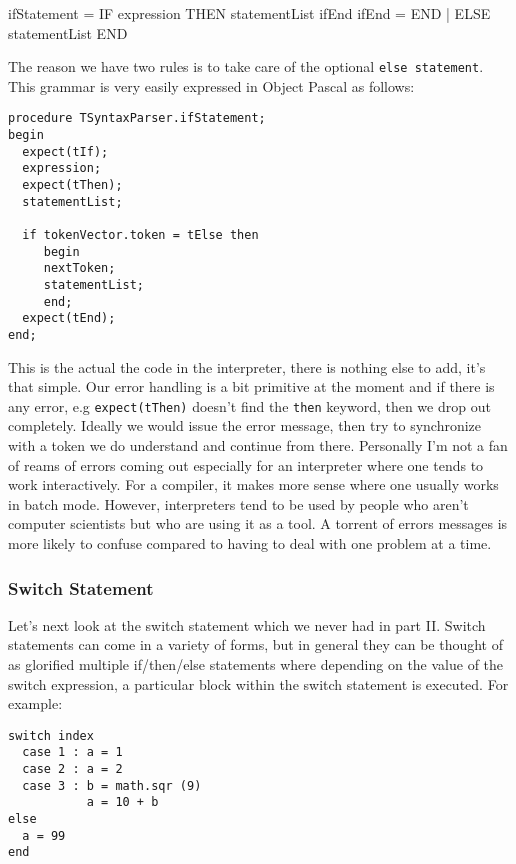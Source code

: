 \begin{small}
\begin{code}
ifStatement    = IF expression THEN statementList ifEnd
ifEnd          = END
                 | ELSE statementList END
\end{code}
\end{small}

The reason we have two rules is to take care of the optional {\tt else statement}.  This grammar is very easily expressed in Object Pascal as follows:

\begin{lstlisting}
procedure TSyntaxParser.ifStatement;
begin
  expect(tIf);
  expression;
  expect(tThen);
  statementList;

  if tokenVector.token = tElse then
     begin
     nextToken;
     statementList;
     end;
  expect(tEnd);
end;
\end{lstlisting}

This is the actual the code in the interpreter, there is nothing else to add, it's that simple. Our error handling is a bit primitive at the moment and if there is any error, e.g {\tt expect(tThen)} doesn't find the {\tt then} keyword, then we drop out completely. Ideally we would issue the error message, then try to synchronize with a token we do understand and continue from there. Personally I'm not a fan of reams of errors coming out especially for an interpreter where one tends to work interactively. For a compiler, it makes more sense where one usually works in batch mode. However, interpreters tend to be used by people who aren't computer scientists but who are using it as a tool. A torrent of errors messages is more likely to confuse compared to having to deal with one problem at a time. 

\subsubsection*{Switch Statement}

Let's next look at the switch statement which we never had in part II. Switch statements can come in a variety of forms, but in general they can be thought of as glorified multiple if/then/else statements where depending on the value of the switch expression, a particular block within the switch statement is executed. For example:

\begin{lstlisting}
switch index
  case 1 : a = 1
  case 2 : a = 2
  case 3 : b = math.sqr (9)
           a = 10 + b
else
  a = 99
end
\end{lstlisting}

